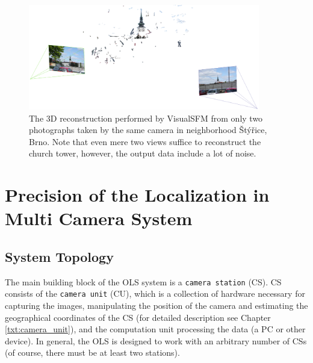 \begin{figure}[tbh]
	\centering
	\includegraphics[width=0.9\textwidth]{fig/visualsfm_tower.png}
	\caption{The 3D reconstruction performed by VisualSFM from only two photographs taken by the same camera in neighborhood Štýřice, Brno. Note that even mere two views suffice to reconstruct the church tower, however, the output data include a lot of noise.}
	\label{fig:visualsfm_tower}
\end{figure}

\chapter{Precision of the Localization in Multi Camera System} \label{txt:precision_of_the_localization}

\section{System Topology}

The main building block of the OLS system is a \texttt{camera station} (CS). CS consists of the \texttt{camera unit} (CU), which is a collection of hardware necessary for capturing the images, manipulating the position of the camera and estimating the geographical coordinates of the CS (for detailed description see Chapter \ref{txt:camera_unit}), and the computation unit processing the data (a PC or other device). In general, the OLS is designed to work with an arbitrary number of CSs (of course, there must be at least two stations).

